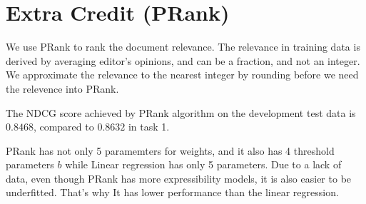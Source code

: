 \section*{Extra Credit (PRank)}

We use PRank to rank the document relevance. The relevance in training data is derived by averaging editor's opinions, and can be a fraction, and not an integer.
We approximate the relevance to the nearest integer by rounding before we need the relevence into PRank.

The NDCG score achieved by PRank algorithm on the development test data is $0.8468$, compared to $0.8632$ in task 1.

PRank has not only 5 paramemters for weights, and it also has 4 threshold parameters $b$ while Linear regression has only 5 parameters.
Due to a lack of data, even though PRank has more expressibility models, it is also easier to be underfitted. That's why It has lower performance than the linear regression.



